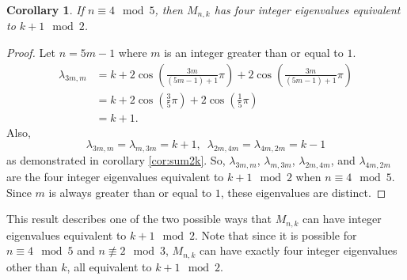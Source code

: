 \documentclass[12pt]{article}
\newtheorem{corollary}{Corollary}
\begin{document}
	\begin{corollary}\label{cor:orange15}\label{cor:4mod5}
		If $n \equiv 4 \mod 5$, then $M_{n,k}$ has four integer eigenvalues equivalent
		to $k + 1 \mod 2$.
	\end{corollary}
	\begin{proof}
		Let $n = 5m-1$ where $m$ is an integer greater than or equal to $1$.
		\begin{align*}
		\lambda_{3m,m} &= k + 2\cos{\left(\frac{3m}{(5m-1)+1}\pi\right)} +
		2\cos{\left(\frac{3m}{(5m-1)+1}\pi\right)} \\
		&= k + 2\cos{\left(\frac{3}{5}\pi\right)} +
		2\cos{\left(\frac{1}{5}\pi\right)} \\
		&= k + 1.
		\end{align*}
		Also,
		\begin{equation*}
		\lambda_{3m,m} = \lambda_{m,3m} = k+1, \hspace{6pt} \lambda_{2m,4m} =
		\lambda_{4m,2m} = k-1
		\end{equation*}
		as demonstrated in corollary \ref{cor:sum2k}.
		So, $\lambda_{3m,m}$, $\lambda_{m,3m}$, $\lambda_{2m,4m}$, and
		$\lambda_{4m,2m}$ are the four integer eigenvalues equivalent to $k + 1 \mod 2$
		when $n \equiv 4 \mod 5$.
		Since $m$ is always greater than or equal to $1$, these eigenvalues are
		distinct.
	\end{proof}
	This result describes one of the two possible ways that $M_{n,k}$ can have
	integer eigenvalues equivalent to $k+1 \mod 2$.
	Note that since it is possible for $n \equiv 4 \mod 5$ and $n \not\equiv 2 \mod 3$, $M_{n,k}$ can have exactly four integer eigenvalues other than $k$, all
	equivalent to $k+1 \mod 2$.
	
\end{document}
